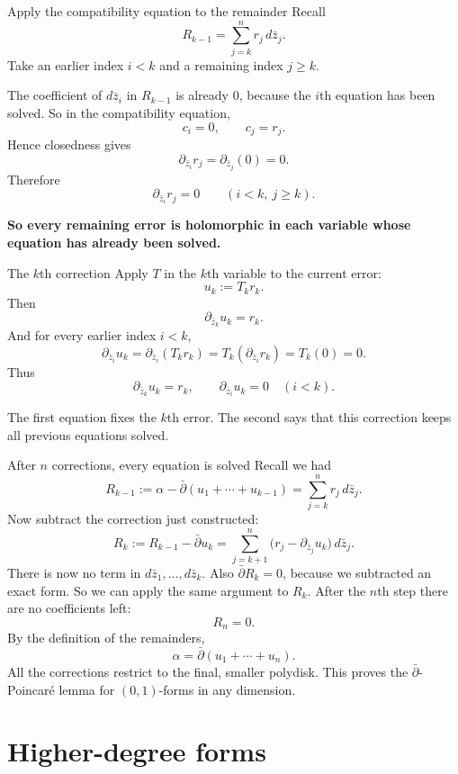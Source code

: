 \documentclass[aspectratio=169,11pt]{beamer}
\newcommand{\db}{\bar\partial}
\begin{document}
\begin{frame}{Apply the compatibility equation to the remainder}
Recall
\[
 R_{k-1}=\sum_{j=k}^n r_j\,d\bar z_j.
\]
Take an earlier index $i<k$ and a remaining index $j\ge k$.

The coefficient of $d\bar z_i$ in $R_{k-1}$ is already $0$,
because the $i$th equation has been solved.
So in the compatibility equation,
\[
 c_i=0,\qquad c_j=r_j.
\]
Hence closedness gives
\[
 \partial_{\bar z_i}r_j
 =\partial_{\bar z_j}(0)=0.
\]
Therefore
\[
 \boxed{\partial_{\bar z_i}r_j=0
 \qquad(i<k,\ j\ge k).}
\]

{\bf So every remaining error is holomorphic in each variable
whose equation has already been solved.}
\end{frame}

\begin{frame}{The $k$th correction}
Apply $T$ in the $k$th variable to the current error:
\[
 u_k:=T_k r_k.
\]
Then
\[
 \partial_{\bar z_k}u_k=r_k.
\]
And for every earlier index $i<k$,
\[
 \partial_{\bar z_i}u_k
 =\partial_{\bar z_i}(T_k r_k)
 =T_k(\partial_{\bar z_i}r_k)
 =T_k(0)=0.
\]
Thus
\[
 \boxed{
 \partial_{\bar z_k}u_k=r_k,
 \qquad
 \partial_{\bar z_i}u_k=0\quad(i<k).
 }
\]

The first equation fixes the $k$th error.
The second says that this correction keeps all previous equations solved.
\end{frame}

\begin{frame}{After $n$ corrections, every equation is solved}
Recall we had
\[
 R_{k-1}:=\alpha-\db(u_1+\cdots+u_{k-1})
 =\sum_{j=k}^n r_j\,d\bar z_j.
\]
Now subtract the correction just constructed:
\[
 R_k:=R_{k-1}-\db u_k
 =\sum_{j=k+1}^n
   \bigl(r_j-\partial_{\bar z_j}u_k\bigr)\,d\bar z_j.
\]
There is now no term in $d\bar z_1,\ldots,d\bar z_k$.
Also $\db R_k=0$, because we subtracted an exact form.
So we can apply the same argument to $R_k$.
After the $n$th step there are no coefficients left:
\[
 R_n=0.
\]
By the definition of the remainders,
\[
 \boxed{\alpha=\db(u_1+\cdots+u_n).}
\]
All the corrections restrict to the final, smaller polydisk.
This proves the $\db$-Poincar\'e lemma for $(0,1)$-forms in any dimension.
\end{frame}

\section{Higher-degree forms}
\end{document}
